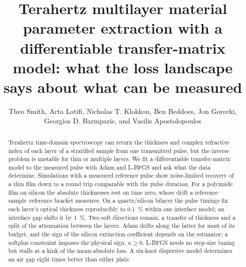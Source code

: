 \documentclass{optica-article}
\newcommand{\kap}{\kappa}
\begin{document}
\title{Terahertz multilayer material parameter extraction with a differentiable transfer-matrix model: what the loss landscape says about what can be measured}

\author{Theo Smith, Arta Latifi, Nicholas T. Klokkou, Ben Beddoes, Jon Gorecki, Georgios D. Barmparis, and Vasilis Apostolopoulos}

\address{School of Physics and Astronomy, University of Southampton, Southampton SO17 1BJ, United Kingdom\\
Royal School of Mines, Imperial College London, London SW7 2AZ, United Kingdom\\
Laser and THz Laboratory, Department of Physics, University of Crete, Heraklion 70013, Greece\\
Twenty-One Semiconductors GmbH, Neckartenzlingen, Germany\\
Optoelectronics Research Centre, University of Southampton, Southampton SO17 1BJ, United Kingdom\\
}


\begin{abstract}
Terahertz time-domain spectroscopy can return the thickness and complex refractive index of each layer of a stratified sample from one transmitted pulse, but the inverse problem is unstable for thin or multiple layers. We fit a differentiable transfer-matrix model to the measured pulse with Adam and L-BFGS and ask what the data determine. Simulations with a measured reference pulse show noise-limited recovery of a thin film down to a round trip comparable with the pulse duration. For a polyimide film on silicon the absolute thicknesses rest on time zero, whose drift a reference--sample--reference bracket measures. On a quartz/silicon bilayer the pulse timings fix each layer's optical thickness reproducibly to \SI{0.1}{\percent} within one interface model; an interface gap shifts it by \SI{1}{\percent}. Two soft directions remain, a transfer of thickness and a split of the attenuation between the layers. Adam drifts along the latter for most of its budget, and the sign of the silicon extinction coefficient depends on the estimator; a softplus constraint imposes the physical sign, $\kap\ge0$. L-BFGS needs no step-size tuning but stalls at a kink of the mean-absolute loss. A six-knot dispersive model determines an air gap eight times better than either plate.
\end{abstract}
\end{document}
